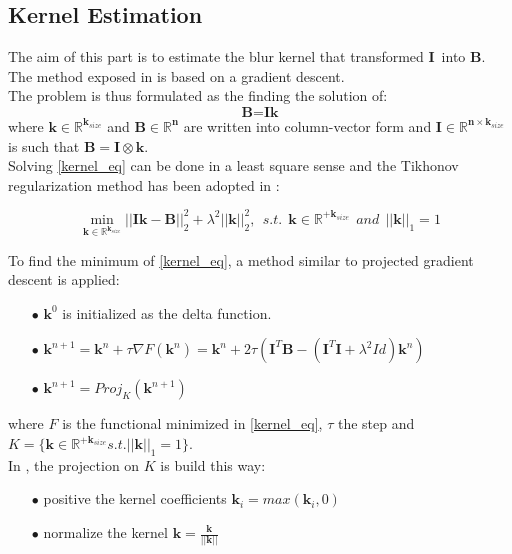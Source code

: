 \documentclass{article}
\newcommand{\I}{\textbf{I}}
\newcommand{\B}{\textbf{B}}
\newcommand{\kernel}{\textbf{k}}
\newcommand{\ksize}{\textbf{k$_{size}$}}
\newcommand{\Isize}{\textbf{n}}
\begin{document}
\subsection{ Kernel Estimation }

The aim of this part is to estimate the blur kernel that transformed \I\ into \B. The method exposed in \cite{deblur_denoise} is based on a gradient descent.\\ 
The problem is thus formulated as the finding the solution of:
\begin{equation}
	\B = \I\kernel
\label{kernel_eq}
\end{equation}
where $\kernel \in \mathbb{R}^{\ksize}$ and $\B \in \mathbb{R}^{\Isize}$ are written into column-vector form and $\I  \in \mathbb{R}^{\Isize \times \ksize}$ is such that $\B = \I \otimes \kernel$.\\
Solving \eqref{kernel_eq} can be done in a least square sense and the Tikhonov regularization method has been adopted in \cite{deblur_denoise}:

\begin{equation}
\min_{\kernel \in \mathbb{R}^{\ksize}} ||\I\kernel - \B||_2^2 + \lambda^2||\kernel||_2^2, \ \ s.t. \ \ \kernel \in \mathbb{R}^{+\ksize} \ \ and \ \ ||\kernel||_1 = 1 
\label{kernel_eq2}
\end{equation}

To find the minimum of \eqref{kernel_eq}, a method similar to projected gradient descent is applied:
\begin{itemize}
	\item[$\bullet$] $\kernel^0$ is initialized as the delta function.
	\item[$\bullet$] $\kernel^{n+1} = \kernel^n + \tau\nabla F(\kernel^n) = \kernel^n + 2\tau(\I^T\B - (\I^T\I +\lambda^2Id)\kernel^n)$
	\item[$\bullet$] $\kernel^{n+1} = Proj_K(\kernel^{n+1})$
\end{itemize}

where $F$ is the functional minimized in \eqref{kernel_eq}, $\tau$ the step and $K=\{\kernel \in \mathbb{R}^{+\ksize} s.t. ||\kernel||_1 = 1 \}$. \\
In \cite{deblur_denoise}, the projection on $K$ is build this way:

\begin{itemize}
	\item[$\bullet$] positive the kernel coefficients $\kernel_i= max(\kernel_i, 0)$
	\item[$\bullet$] normalize the kernel $\kernel = \frac{\kernel}{||\kernel||}$
\end{itemize}
\end{document}
